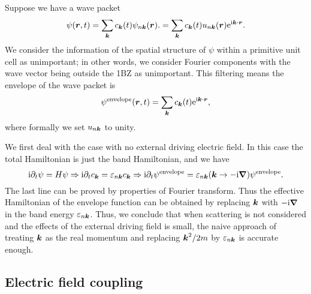 \documentclass[hyperref, a4paper]{article}
\newcommand*{\ii}{\mathrm{i}}
\newcommand*{\ee}{\mathrm{e}}
\begin{document}
Suppose we have a wave packet 
\begin{equation}
    \psi(\vb*{r}, t) = \sum_{\vb*{k}} c_{\vb*{k}}(t) \psi_{n \vb*{k}}(\vb*{r}).
    = \sum_{\vb*{k}} c_{\vb*{k}}(t) u_{n \vb*{k}}(\vb*{r}) \ee^{\ii \vb*{k} \cdot \vb*{r}}.
\end{equation}
We consider the information of the spatial structure of $\psi$
within a primitive unit cell as unimportant; 
in other words, we consider Fourier components with 
the wave vector being outside the 1BZ as unimportant.
This filtering means the envelope of the wave packet is 
\begin{equation}
    \psi^{\text{envelope}}(\vb*{r}, t)
    = \sum_{\vb*{k}} c_{\vb*{k}}(t) \ee^{\ii \vb*{k} \cdot \vb*{r}}, 
\end{equation}
where formally we set $u_{n \vb*{k}}$ to unity.

We first deal with the case with no external driving electric field. 
In this case the total Hamiltonian is just the band Hamiltonian, 
and we have 
\begin{equation}
    \ii \partial_t \psi = H \psi \Rightarrow
    \ii \partial_t c_{\vb*{k}} = \varepsilon_{n \vb*{k}} c_{\vb*{k}} \Rightarrow
    \ii \partial_t \psi^{\text{envelope}} = \varepsilon_{n \vb*{k}}(\vb*{k} \to - \ii \grad) \psi^{\text{envelope}} .
\end{equation}
The last line can be proved by properties of Fourier transform.
Thus the effective Hamiltonian of the envelope function 
can be obtained by replacing $\vb*{k}$ with $- \ii \grad$ 
in the band energy $\varepsilon_{n \vb*{k}}$.
Thus, we conclude that when scattering is not considered 
and the effects of the external driving field is small, 
the naive approach of treating $\vb*{k}$ as the real momentum 
and replacing $\vb*{k}^2 / 2m$ by $\varepsilon_{n \vb*{k}}$
is accurate enough.

\subsection{Electric field coupling}
\end{document}
